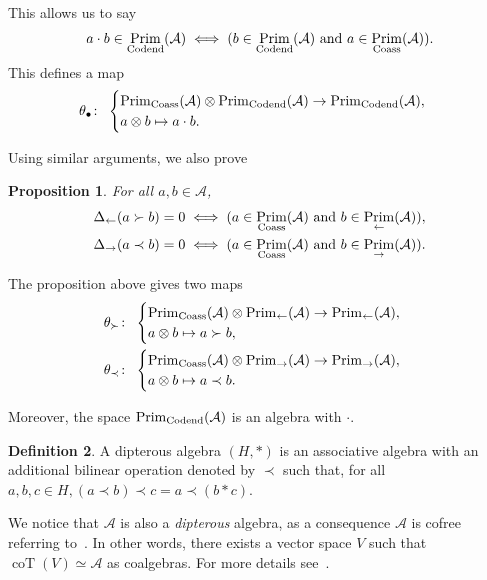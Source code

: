 \documentclass[pdftex]{sigma}
\numberwithin{equation}{section}
\theoremstyle{definition}
\newtheorem{defi}{Definition}[section]
\theoremstyle{plain}
\newtheorem{Prop}[defi]{Proposition}
\DeclareMathOperator{\Prim}{Prim}
\DeclareMathOperator{\coT}{coT}
\begin{document}
This allows us to say
\[
a\cdot b\in \Prim_{\rm Codend}(\mathcal{A}) \iff (b\in\Prim_{\rm Codend}(\mathcal{A}) \  \text{and} \  a\in\Prim_{\rm Coass}(\mathcal{A})).
\]
This defines a map
\begin{equation*}
	\theta_{\bullet}\colon \ \begin{cases}
		\Prim_{\rm Coass}(\mathcal{A})\otimes \Prim_{\rm Codend}(\mathcal{A}) \rightarrow \Prim_{\rm Codend}(\mathcal{A}), \\
		a\otimes b \mapsto a\cdot b.
	\end{cases}
\end{equation*}

Using similar arguments, we also prove
\begin{Prop}
	For all $a,b\in \mathcal{A}$,
	\begin{gather*}
		\Delta_{\leftarrow}(a\succ b)=0\iff (a\in\Prim_{\rm Coass}(\mathcal{A}) \  \text{\rm and} \  b\in \Prim_{\leftarrow}(\mathcal{A})), \\
		\Delta_{\rightarrow}(a\prec b)=0\iff (a\in\Prim_{\rm Coass}(\mathcal{A}) \  \text{\rm and} \  b\in \Prim_{\rightarrow}(\mathcal{A})).
	\end{gather*}
\end{Prop}
 The proposition above gives two maps
\begin{align*}
	&\theta_{\succ}\colon \ \begin{cases}
		\Prim_{\rm Coass}(\mathcal{A})\otimes \Prim_{\leftarrow}(\mathcal{A}) \rightarrow \Prim_{\leftarrow}(\mathcal{A}),\\
		a\otimes b \mapsto a\succ b,
	\end{cases} \\
&\theta_{\prec}\colon \ \begin{cases}
	\Prim_{\rm Coass}(\mathcal{A})\otimes \Prim_{\rightarrow}(\mathcal{A}) \rightarrow \Prim_{\rightarrow}(\mathcal{A}), \\
	a\otimes b \mapsto a\prec b.
\end{cases}
\end{align*}

Moreover, the space $\Prim_{\rm Codend}(\mathcal{A})$ is an algebra with $\cdot$.

\begin{defi}
	A dipterous algebra $(H,*)$ is an associative algebra with an additional bilinear operation denoted by $\prec$ such that, for all $a,b,c\in H, (a\prec b)\prec c= a\prec (b*c)$.
\end{defi} We notice that $\mathcal{A}$ is also a \emph{dipterous} algebra, as a consequence $\mathcal{A}$ is cofree referring to~\cite{diptere}. In other words, there exists a vector space $V$ such that $\coT(V)\simeq \mathcal{A}$ as coalgebras. For more details see~\cite{diptere}.
\end{document}
